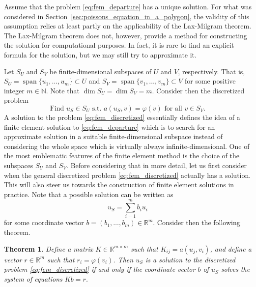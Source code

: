 \documentclass[english, 12pt, a4paper, sci, utf8, a-2b, online]{aaltothesis}
\theoremstyle{definition}
\theoremstyle{plain}
\newtheorem{theorem}{Theorem}[section]
\DeclareMathOperator{\spn}{span}
\numberwithin{equation}{section}
\begin{document}
Assume that the problem \eqref{eq:fem_departure} has a unique solution.
For what was considered in Section~\ref{sec:poissons_equation_in_a_polygon},
the validity of this assumption relies at least partly on the applicability
of the Lax-Milgram theorem. The Lax-Milgram theorem does not, however,
provide a method for constructing the solution for computational purposes.
In fact, it is rare to find an explicit formula for the solution,
but we may still try to approximate it.

Let $S_U$ and $S_V$ be finite-dimensional subspaces of $U$ and $V$,
respectively. That is, $S_U = \spn \{ u_1,\dotsc,u_m \} \subset U$
and $S_V = \spn \{ v_1,\dotsc,v_m \} \subset V$
for some positive integer $m \in \mathbb{N}$.
Note that $\dim S_U = \dim S_V = m$.
Consider then the discretized problem
\begin{equation}
    \label{eq:fem_discretized}
    \text{Find } u_S \in S_U \text{ s.t.\ }
    a(u_S,v) = \varphi(v) \text{ for all } v \in S_V.
\end{equation}
A solution to the problem \eqref{eq:fem_discretized} essentially
defines the idea of a finite element solution to \eqref{eq:fem_departure}
which is to search for an approximate solution in a suitable finite-dimensional
subspace instead of considering the whole space which is virtually always
infinite-dimensional. One of the most emblematic features of
the finite element method is the choice of the subspaces $S_U$ and $S_V$.
Before considering that in more detail, let us first consider when the general
discretized problem \eqref{eq:fem_discretized} actually has a solution.
This will also steer us towards the construction of finite element solutions
in practice.
Note that a possible solution can be written as
\begin{equation}
    \label{eq:uS_wrt_basis}
    u_S = \sum_{i=1}^{m} b_i u_i
\end{equation}
for some coordinate vector $b = (b_1,\dotsc,b_m) \in \mathbb{R}^m$.
Consider then the following theorem.
\begin{theorem}
    \label{thm:discretized_problem_solution_equivalence}
    Define a matrix $K \in \mathbb{R}^{m \times m}$ such that
    $K_{ij} = a(u_j,v_i)$, and define a vector $r \in \mathbb{R}^m$
    such that $r_i = \varphi(v_i)$. Then $u_S$ is a solution
    to the discretized problem \eqref{eq:fem_discretized}
    if and only if the coordinate vector $b$ of $u_S$ solves the system
    of equations $Kb = r$.
\end{theorem}
\end{document}
